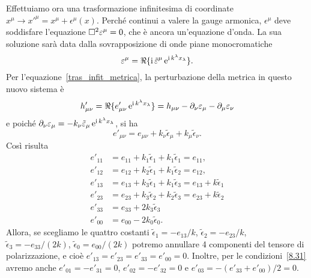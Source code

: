 Effettuiamo ora una trasformazione infinitesima di coordinate $x^{\mu} \to
x'^{\mu} = x^{\mu} + \epsilon^{\mu}(x)$.  Perché continui a valere la gauge
armonica, $\epsilon^{\mu}$ deve soddisfare l'equazione $\Box^{2} \varepsilon^{\mu} =
0$, che è ancora un'equazione d'onda.  La sua soluzione sarà data dalla
sovrapposizione di onde piane monocromatiche
\begin{equation}
  \varepsilon^{\mu} = \Re\{\operatorname{\mathrm{i}}\tilde{\varepsilon}^{\mu}\operatorname{\mathrm{e}}^{\operatorname{\mathrm{i}}
    k^{\lambda}x_{\lambda}}\}.
\end{equation}
Per l'equazione~\eqref{tras_infit_metrica}, la perturbazione della metrica in
questo nuovo sistema è
\begin{equation}
  h'_{\mu\nu} = \Re\{e'_{\mu\nu} \operatorname{\mathrm{e}}^{\operatorname{\mathrm{i}} k^{\lambda}x_{\lambda}}\} =
  h_{\mu\nu} - \partial_{\nu}\varepsilon_{\mu} - \partial_{\mu}\varepsilon_{\nu}
\end{equation}
e poiché $\partial_{\nu}\varepsilon_{\mu} = - k_{\nu}\tilde{\varepsilon}_{\mu}
\operatorname{\mathrm{e}}^{\operatorname{\mathrm{i}} k^{\lambda}x_{\lambda}}$, si ha
\begin{equation}
  e'_{\mu\nu} = e_{\mu\nu} + k_{\nu}\tilde{\epsilon}_{\mu} +
  k_{\mu}\tilde{\epsilon}_{\nu}.
\end{equation}
Così risulta
\begin{subequations}
  \begin{align}
    e'_{11} &= e_{11} + k_{1} \tilde{\epsilon}_{1} + k_{1}\tilde{\epsilon}_{1} =
              e_{11}, \\
    e'_{12} &= e_{12} + k_{2}\tilde{\epsilon}_{1} + k_{1}\tilde{\epsilon}_{2} =
              e_{12}, \\
    e'_{13} &= e_{13} + k_{3}\tilde{\epsilon}_{1} + k_{1}\tilde{\epsilon}_{3} =
              e_{13} + k\tilde{\epsilon}_{1}  \\
    e'_{23} &= e_{23} + k_{3}\tilde{\epsilon}_{2} + k_{2}\tilde{\epsilon}_{3} =
              e_{23} + k\tilde{\epsilon}_{2} \\
    e'_{33} &= e_{33} + 2 k_{3}\tilde{\epsilon}_{3} \\
    e'_{00} &= e_{00} - 2 k_{0}\tilde{\epsilon}_{0}.
  \end{align}
\end{subequations}
Allora, se scegliamo le quattro costanti
$\tilde{\epsilon}_{1} = - e_{13}/k$,
$\tilde{\epsilon}_{2} = - e_{23}/k$,
$\tilde{\epsilon}_{3} = - e_{33}/(2k)$,
$\tilde{\epsilon}_{0} = e_{00}/(2k)$
potremo annullare 4 componenti del tensore di polarizzazione, e cioè
$e'_{13} =  e'_{23} = e'_{33} = e'_{00} = 0$.
Inoltre, per le condizioni~\eqref{8.31} avremo anche
$e'_{01} = -e'_{31} = 0$, $e'_{02} = -e'_{32} = 0$ e
$e'_{03} = -(e'_{33}+e'_{00})/2 = 0$.

